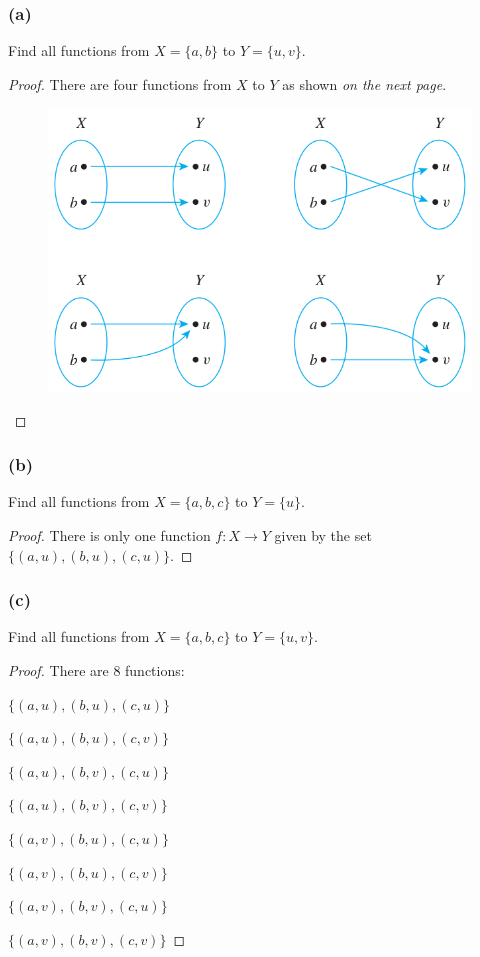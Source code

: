 \documentclass[14pt]{extarticle}
\begin{document}
\subsubsection{(a)}
Find all functions from \(X = \{a, b\}\) to \(Y = \{u, v\}\).

\begin{proof}
There are four functions from $X$ to $Y$ as shown {\it on the next page}.

\begin{figure}[ht!]
\centering
\includegraphics[scale=0.5]{../images/7.1.4.a.png}
\end{figure}

\end{proof}

\subsubsection{(b)}
Find all functions from \(X = \{a, b, c\}\) to \(Y = \{u\}\).

\begin{proof}
There is only one function $f: X \to Y$ given by the set \(\{(a,u), (b,u), (c,u)\}\).
\end{proof}

\subsubsection{(c)}
Find all functions from \(X = \{a, b, c\}\) to \(Y = \{u, v\}\).

\begin{proof}
There are 8 functions:

\(\{(a,u), (b,u), (c,u)\}\)

\(\{(a,u), (b,u), (c,v)\}\)

\(\{(a,u), (b,v), (c,u)\}\)

\(\{(a,u), (b,v), (c,v)\}\)

\(\{(a,v), (b,u), (c,u)\}\)

\(\{(a,v), (b,u), (c,v)\}\)

\(\{(a,v), (b,v), (c,u)\}\)

\(\{(a,v), (b,v), (c,v)\}\)
\end{proof}
\end{document}
